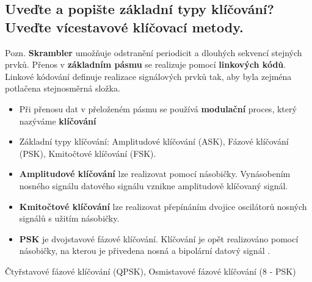 \subsection{Uveďte a popište základní typy klíčování? Uveďte vícestavové klíčovací metody.}
Pozn. \textbf{Skrambler} umožňuje odstranění periodicit a dlouhých sekvencí stejných prvků. Přenos v \textbf{základním pásmu} se realizuje pomocí \textbf{linkových kódů}. Linkové kódování definuje realizace signálových prvků tak, aby byla zejména potlačena stejnosměrná složka.
\begin{itemize}
    \item Při přenosu dat v přeloženém pásmu se používá \textbf{modulační} proces, který nazýváme \textbf{klíčování}
    \item Základní typy klíčování: Amplitudové klíčování (ASK), Fázové klíčování (PSK), Kmitočtové klíčování (FSK).
    \item \textbf{Amplitudové klíčování} lze realizovat pomocí násobičky. Vynásobením nosného signálu datového signálu vznikne amplitudově klíčovaný signál. 
    \item \textbf{Kmitočtové klíčování} lze realizovat přepínáním dvojice oscilátorů nosných signálů s užitím násobičky.
    \item \textbf{PSK} je dvojstavové fázové klíčování. Klíčování je opět realizováno pomocí násobičky, na kterou je přivedena nosná a bipolární datový signál .
\end{itemize}
Čtyřstavové fázové klíčování (QPSK), Osmistavové fázové klíčování (8 - PSK)

